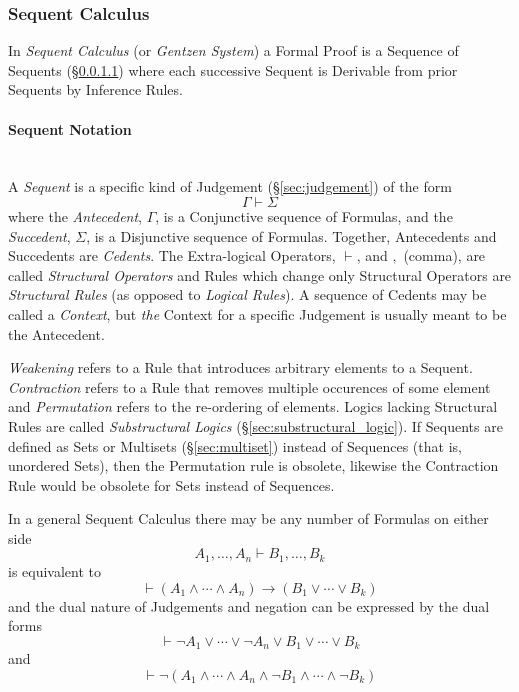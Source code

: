 \subsubsection{Sequent Calculus}\label{sec:sequent_calculus}

In \emph{Sequent Calculus} (or \emph{Gentzen System}) a Formal Proof
is a Sequence of Sequents (\S\ref{sec:sequent_notation}) where each
successive Sequent is Derivable from prior Sequents by Inference
Rules.



\paragraph{Sequent Notation}\label{sec:sequent_notation} \hfill \\

A \emph{Sequent} is a specific kind of Judgement
(\S\ref{sec:judgement}) of the form
\[
    \Gamma \vdash \Sigma
\]
where the \emph{Antecedent}, $\Gamma$, is a Conjunctive sequence of
Formulas, and the \emph{Succedent}, $\Sigma$, is a Disjunctive
sequence of Formulas. Together, Antecedents and Succedents are
\emph{Cedents}. The Extra-logical Operators, $\vdash$, and $,$
(comma), are called \emph{Structural Operators} and Rules which change
only Structural Operators are \emph{Structural Rules} (as opposed to
\emph{Logical Rules}). A sequence of Cedents may be called a
\emph{Context}, but \emph{the} Context for a specific Judgement is
usually meant to be the Antecedent.

\emph{Weakening} refers to a Rule that introduces arbitrary elements
to a Sequent. \emph{Contraction} refers to a Rule that removes
multiple occurences of some element and \emph{Permutation} refers to
the re-ordering of elements. Logics lacking Structural Rules are
called \emph{Substructural Logics} (\S\ref{sec:substructural_logic}).
If Sequents are defined as Sets or Multisets (\S\ref{sec:multiset})
instead of Sequences (that is, unordered Sets), then the Permutation
rule is obsolete, likewise the Contraction Rule would be obsolete for
Sets instead of Sequences.

In a general Sequent Calculus there may be any number of Formulas on
either side
\[
    A_1, \ldots, A_n \vdash B_1, \ldots, B_k
\]
is equivalent to
\[
    \vdash(A_1 \wedge \cdots \wedge A_n) \rightarrow (B_1 \vee \cdots \vee B_k)
\]
and the dual nature of Judgements and negation can be expressed by the
dual forms
\[
    \vdash \neg A_1 \vee \cdots \vee \neg A_n \vee B_1 \vee \cdots
    \vee B_k
\]
and
\[
    \vdash \neg(A_1 \wedge \cdots \wedge A_n \wedge \neg B_1 \wedge
    \cdots \wedge \neg B_k)
\]

